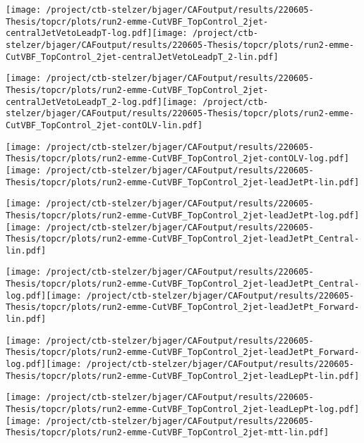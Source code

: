 \documentclass{article}
\begin{document}
\texttt{[image: /project/ctb-stelzer/bjager/CAFoutput/results/220605-Thesis/topcr/plots/run2-emme-CutVBF\_TopControl\_2jet-centralJetVetoLeadpT-log.pdf]}\texttt{[image: /project/ctb-stelzer/bjager/CAFoutput/results/220605-Thesis/topcr/plots/run2-emme-CutVBF\_TopControl\_2jet-centralJetVetoLeadpT\_2-lin.pdf]}

\texttt{[image: /project/ctb-stelzer/bjager/CAFoutput/results/220605-Thesis/topcr/plots/run2-emme-CutVBF\_TopControl\_2jet-centralJetVetoLeadpT\_2-log.pdf]}\texttt{[image: /project/ctb-stelzer/bjager/CAFoutput/results/220605-Thesis/topcr/plots/run2-emme-CutVBF\_TopControl\_2jet-contOLV-lin.pdf]}

\texttt{[image: /project/ctb-stelzer/bjager/CAFoutput/results/220605-Thesis/topcr/plots/run2-emme-CutVBF\_TopControl\_2jet-contOLV-log.pdf]}\texttt{[image: /project/ctb-stelzer/bjager/CAFoutput/results/220605-Thesis/topcr/plots/run2-emme-CutVBF\_TopControl\_2jet-leadJetPt-lin.pdf]}

\texttt{[image: /project/ctb-stelzer/bjager/CAFoutput/results/220605-Thesis/topcr/plots/run2-emme-CutVBF\_TopControl\_2jet-leadJetPt-log.pdf]}\texttt{[image: /project/ctb-stelzer/bjager/CAFoutput/results/220605-Thesis/topcr/plots/run2-emme-CutVBF\_TopControl\_2jet-leadJetPt\_Central-lin.pdf]}

\texttt{[image: /project/ctb-stelzer/bjager/CAFoutput/results/220605-Thesis/topcr/plots/run2-emme-CutVBF\_TopControl\_2jet-leadJetPt\_Central-log.pdf]}\texttt{[image: /project/ctb-stelzer/bjager/CAFoutput/results/220605-Thesis/topcr/plots/run2-emme-CutVBF\_TopControl\_2jet-leadJetPt\_Forward-lin.pdf]}

\texttt{[image: /project/ctb-stelzer/bjager/CAFoutput/results/220605-Thesis/topcr/plots/run2-emme-CutVBF\_TopControl\_2jet-leadJetPt\_Forward-log.pdf]}\texttt{[image: /project/ctb-stelzer/bjager/CAFoutput/results/220605-Thesis/topcr/plots/run2-emme-CutVBF\_TopControl\_2jet-leadLepPt-lin.pdf]}

\texttt{[image: /project/ctb-stelzer/bjager/CAFoutput/results/220605-Thesis/topcr/plots/run2-emme-CutVBF\_TopControl\_2jet-leadLepPt-log.pdf]}\texttt{[image: /project/ctb-stelzer/bjager/CAFoutput/results/220605-Thesis/topcr/plots/run2-emme-CutVBF\_TopControl\_2jet-mtt-lin.pdf]}
\end{document}
